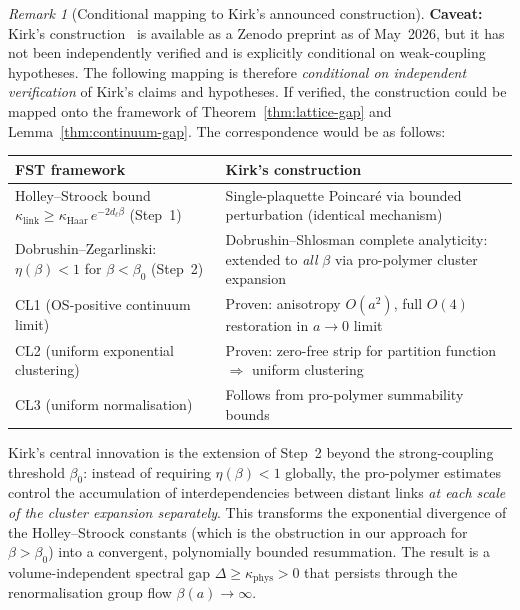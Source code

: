 \documentclass[12pt,a4paper]{article}
\theoremstyle{definition}
\theoremstyle{plain}
\theoremstyle{remark}
\newtheorem{remark}[definition]{Remark}
\begin{document}
\begin{remark}[Conditional mapping to Kirk's announced construction]\label{rem:kirk-mapping}
\textbf{Caveat:} Kirk's construction~\cite{Kirk2026} is available as a Zenodo preprint as of May~2026, but it has not been independently verified and is explicitly conditional on weak-coupling hypotheses. The following mapping is therefore \emph{conditional on independent verification} of Kirk's claims and hypotheses. If verified, the construction could be mapped onto the framework
of Theorem~\ref{thm:lattice-gap} and Lemma~\ref{thm:continuum-gap}. The correspondence would be as follows:

\begin{center}
\small
\begin{tabularx}{\textwidth}{@{}Y Y@{}}
\toprule
\textbf{FST framework} & \textbf{Kirk's construction} \\
\midrule
Holley--Stroock bound $\kappa_{\mathrm{link}} \geq \kappa_{\mathrm{Haar}}\,
e^{-2 d_\ell \beta}$ (Step~1)
& Single-plaquette Poincar\'e via bounded perturbation
  (identical mechanism) \\[4pt]
Dobrushin--Zegarlinski: $\eta(\beta) < 1$ for $\beta < \beta_0$ (Step~2)
& Dobrushin--Shlosman complete analyticity:
  extended to \emph{all} $\beta$ via pro-polymer
  cluster expansion \\[4pt]
CL1 (OS-positive continuum limit)
& Proven: anisotropy $O(a^2)$, full $O(4)$
  restoration in $a \to 0$ limit \\[4pt]
CL2 (uniform exponential clustering)
& Proven: zero-free strip for partition function
  $\Rightarrow$ uniform clustering \\[4pt]
CL3 (uniform normalisation)
& Follows from pro-polymer summability bounds \\
\bottomrule
\end{tabularx}
\end{center}

\noindent
Kirk's central innovation is the extension of Step~2 beyond the
strong-coupling threshold $\beta_0$: instead of requiring $\eta(\beta) < 1$
globally, the pro-polymer estimates control the accumulation of
interdependencies between distant links \emph{at each scale of the
cluster expansion separately}. This transforms the exponential
divergence of the Holley--Stroock constants (which is the obstruction
in our approach for $\beta > \beta_0$) into a convergent,
polynomially bounded resummation. The result is a volume-independent
spectral gap $\Delta \geq \kappa_{\mathrm{phys}} > 0$ that persists
through the renormalisation group flow $\beta(a) \to \infty$.


\end{remark}
\end{document}
